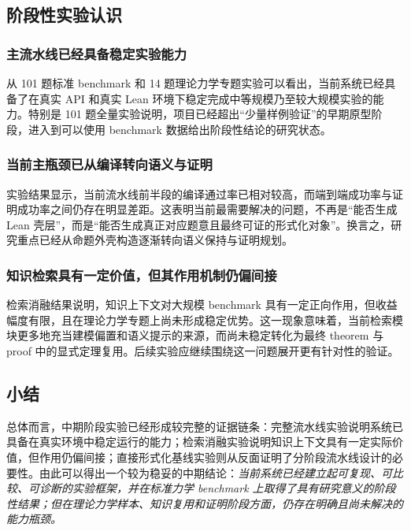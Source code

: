 \documentclass[12pt,a4paper]{ctexart}
\begin{document}
\subsection{阶段性实验认识}

\subsubsection{主流水线已经具备稳定实验能力}

从 101 题标准 benchmark 和 14 题理论力学专题实验可以看出，当前系统已经具备了在真实 API 和真实 Lean 环境下稳定完成中等规模乃至较大规模实验的能力。特别是 101 题全量实验说明，项目已经超出“少量样例验证”的早期原型阶段，进入到可以使用 benchmark 数据给出阶段性结论的研究状态。

\subsubsection{当前主瓶颈已从编译转向语义与证明}

实验结果显示，当前流水线前半段的编译通过率已相对较高，而端到端成功率与证明成功率之间仍存在明显差距。这表明当前最需要解决的问题，不再是“能否生成 Lean 壳层”，而是“能否生成真正对应题意且最终可证的形式化对象”。换言之，研究重点已经从命题外壳构造逐渐转向语义保持与证明规划。

\subsubsection{知识检索具有一定价值，但其作用机制仍偏间接}

检索消融结果说明，知识上下文对大规模 benchmark 具有一定正向作用，但收益幅度有限，且在理论力学专题上尚未形成稳定优势。这一现象意味着，当前检索模块更多地充当建模偏置和语义提示的来源，而尚未稳定转化为最终 theorem 与 proof 中的显式定理复用。后续实验应继续围绕这一问题展开更有针对性的验证。

\subsection{小结}

总体而言，中期阶段实验已经形成较完整的证据链条：完整流水线实验说明系统已具备在真实环境中稳定运行的能力；检索消融实验说明知识上下文具有一定实际价值，但作用仍偏间接；直接形式化基线实验则从反面证明了分阶段流水线设计的必要性。由此可以得出一个较为稳妥的中期结论：\emph{当前系统已经建立起可复现、可比较、可诊断的实验框架，并在标准力学 benchmark 上取得了具有研究意义的阶段性结果；但在理论力学样本、知识复用和证明阶段方面，仍存在明确且尚未解决的能力瓶颈。}
\end{document}

